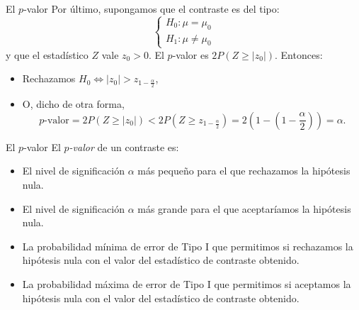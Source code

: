 \documentclass[
  ignorenonframetext,
]{beamer}
\begin{document}
\begin{frame}{El \(p\)-valor}
\protect\hypertarget{el-p-valor-11}{}
Por último, supongamos que el contraste es del tipo: \[
\left\{\begin{array}{l}
H_0:\mu=\mu_0\\ H_1:\mu \neq \mu_0
\end{array}
\right.
\] y que el estadístico \(Z\) vale \(z_0>0\). El \(p\)-valor es
\(2P(Z \geq |z_0|)\). Entonces:

\begin{itemize}[<+->]
\item
  Rechazamos \(H_0 \Longleftrightarrow |z_0|>z_{1-\frac{\alpha}{2}}\),
\item
  O, dicho de otra forma, \[
  \mbox{$p$-valor}=2P(Z \geq |z_0|)<2P(Z\geq z_{1-\frac{\alpha}2})=2\left(1-\left(1-\frac{\alpha}2\right)\right)=\alpha.
  \]
\end{itemize}
\end{frame}

\begin{frame}{El \(p\)-valor}
\protect\hypertarget{el-p-valor-12}{}
El \emph{\(p\)-valor} de un contraste es:

\begin{itemize}[<+->]
\item
  El nivel de significación \(\alpha\) más pequeño para el que
  rechazamos la hipótesis nula.
\item
  El nivel de significación \(\alpha\) más grande para el que
  aceptaríamos la hipótesis nula.
\item
  La probabilidad mínima de error de Tipo I que permitimos si rechazamos
  la hipótesis nula con el valor del estadístico de contraste obtenido.
\item
  La probabilidad máxima de error de Tipo I que permitimos si aceptamos
  la hipótesis nula con el valor del estadístico de contraste obtenido.
\end{itemize}
\end{frame}
\end{document}
